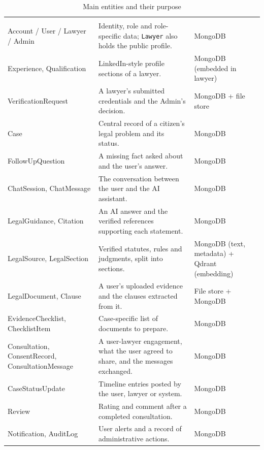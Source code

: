 \begin{longtable}{|L{3.49cm}|L{8.98cm}|L{2.00cm}|}
\caption{Main entities and their purpose}\label{tab:3.5}\\
\hline\headrow {} &  &  \\ \hline
\endfirsthead
\hline\headrow {} &  &  \\ \hline
\endhead
\hline\endlastfoot
Account / User / Lawyer / Admin & Identity, role and role-specific data; \texttt{Lawyer} also holds the public profile. & MongoDB \\ \hline
Experience, Qualification & LinkedIn-style profile sections of a lawyer. & MongoDB (embedded in lawyer) \\ \hline
VerificationRequest & A lawyer's submitted credentials and the Admin's decision. & MongoDB + file store \\ \hline
Case & Central record of a citizen's legal problem and its status. & MongoDB \\ \hline
FollowUpQuestion & A missing fact asked about and the user's answer. & MongoDB \\ \hline
ChatSession, ChatMessage & The conversation between the user and the AI assistant. & MongoDB \\ \hline
LegalGuidance, Citation & An AI answer and the verified references supporting each statement. & MongoDB \\ \hline
LegalSource, LegalSection & Verified statutes, rules and judgments, split into sections. & MongoDB (text, metadata) + Qdrant (embedding) \\ \hline
LegalDocument, Clause & A user's uploaded evidence and the clauses extracted from it. & File store + MongoDB \\ \hline
EvidenceChecklist, ChecklistItem & Case-specific list of documents to prepare. & MongoDB \\ \hline
Consultation, ConsentRecord, ConsultationMessage & A user-lawyer engagement, what the user agreed to share, and the messages exchanged. & MongoDB \\ \hline
CaseStatusUpdate & Timeline entries posted by the user, lawyer or system. & MongoDB \\ \hline
Review & Rating and comment after a completed consultation. & MongoDB \\ \hline
Notification, AuditLog & User alerts and a record of administrative actions. & MongoDB \\
\end{longtable}

